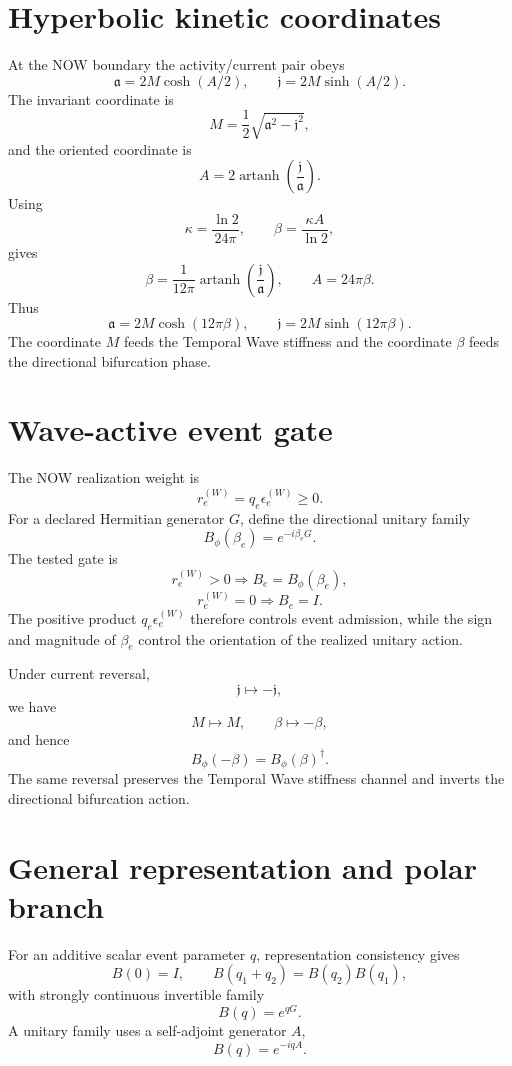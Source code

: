 \section{Hyperbolic kinetic coordinates}

At the NOW boundary the activity/current pair obeys
\[
\mathfrak a=2M\cosh(A/2),
\qquad
\mathfrak j=2M\sinh(A/2).
\]
The invariant coordinate is
\[
\boxed{
M=\frac12\sqrt{\mathfrak a^2-\mathfrak j^2},
}
\]
and the oriented coordinate is
\[
A=2\operatorname{artanh}\!\left(\frac{\mathfrak j}{\mathfrak a}\right).
\]
Using
\[
\kappa=\frac{\ln2}{24\pi},
\qquad
\beta=\frac{\kappa A}{\ln2},
\]
gives
\[
\boxed{
\beta=\frac{1}{12\pi}
\operatorname{artanh}\!\left(\frac{\mathfrak j}{\mathfrak a}\right),
\qquad
A=24\pi\beta.
}
\]
Thus
\[
\boxed{
\mathfrak a=2M\cosh(12\pi\beta),
\qquad
\mathfrak j=2M\sinh(12\pi\beta).
}
\]
The coordinate $M$ feeds the Temporal Wave stiffness and the coordinate $\beta$ feeds the directional bifurcation phase.

\section{Wave-active event gate}

The NOW realization weight is
\[
r_e^{(W)}=q_e\epsilon_e^{(W)}\ge0.
\]
For a declared Hermitian generator $G$, define the directional unitary family
\[
B_\phi(\beta_e)=e^{-i\beta_eG}.
\]
The tested gate is
\[
\boxed{
r_e^{(W)}>0\Rightarrow B_e=B_\phi(\beta_e),}
\]
\[
\boxed{
r_e^{(W)}=0\Rightarrow B_e=I.}
\]
The positive product $q_e\epsilon_e^{(W)}$ therefore controls event admission, while the sign and magnitude of $\beta_e$ control the orientation of the realized unitary action.

Under current reversal,
\[
\mathfrak j\mapsto-\mathfrak j,
\]
we have
\[
M\mapsto M,
\qquad
\beta\mapsto-\beta,
\]
and hence
\[
\boxed{
B_\phi(-\beta)=B_\phi(\beta)^\dagger.
}
\]
The same reversal preserves the Temporal Wave stiffness channel and inverts the directional bifurcation action.

\section{General representation and polar branch}

For an additive scalar event parameter $q$, representation consistency gives
\[
B(0)=I,
\qquad
B(q_1+q_2)=B(q_2)B(q_1),
\]
with strongly continuous invertible family
\[
B(q)=e^{qG}.
\]
A unitary family uses a self-adjoint generator $A$,
\[
B(q)=e^{-iqA}.
\]

